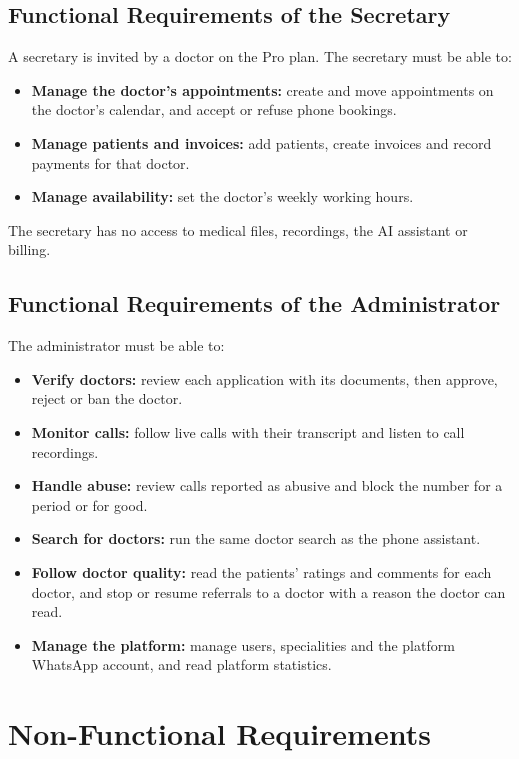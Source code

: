 \subsection{Functional Requirements of the Secretary}
A secretary is invited by a doctor on the Pro plan. The secretary must be able to:
\begin{itemize}
    \item \textbf{Manage the doctor's appointments:} create and move appointments on the doctor's calendar, and accept or refuse phone bookings.
    \item \textbf{Manage patients and invoices:} add patients, create invoices and record payments for that doctor.
    \item \textbf{Manage availability:} set the doctor's weekly working hours.
\end{itemize}
The secretary has no access to medical files, recordings, the AI assistant or billing.

\subsection{Functional Requirements of the Administrator}
The administrator must be able to:
\begin{itemize}
    \item \textbf{Verify doctors:} review each application with its documents, then approve, reject or ban the doctor.
    \item \textbf{Monitor calls:} follow live calls with their transcript and listen to call recordings.
    \item \textbf{Handle abuse:} review calls reported as abusive and block the number for a period or for good.
    \item \textbf{Search for doctors:} run the same doctor search as the phone assistant.
    \item \textbf{Follow doctor quality:} read the patients' ratings and comments for each doctor, and stop or resume referrals to a doctor with a reason the doctor can read.
    \item \textbf{Manage the platform:} manage users, specialities and the platform WhatsApp account, and read platform statistics.
\end{itemize}

\section{Non-Functional Requirements}

